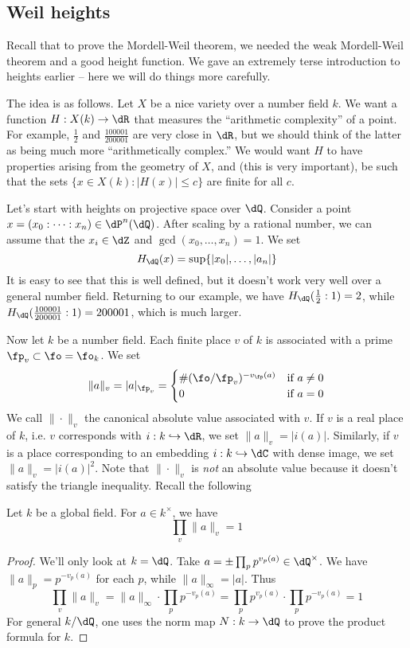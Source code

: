 \subsection{Weil heights}\label{sec:heights}

Recall that to prove the Mordell-Weil theorem, we needed the weak Mordell-Weil 
theorem and a good height function. We gave an extremely terse introduction to 
heights earlier -- here we will do things more carefully. 

The idea is as follows. Let $X$ be a nice variety over a number field $k$. We 
want a function $H:X(k)\to \dR$ that measures the ``arithmetic complexity'' of 
a point. For example, $\frac 1 2$ and $\frac{100001}{200001}$ are very close in 
$\dR$, but we should think of the latter as being much more ``arithmetically 
complex.'' We would want $H$ to have properties arising from the geometry of 
$X$, and (this is very important), be such that the sets 
$\{x\in X(k):|H(x)|\leqslant c\}$ are finite for all $c$. 

Let's start with heights on projective space over $\dQ$. Consider a point 
$x=(x_0:\cdots:x_n)\in \dP^n(\dQ)$. After scaling by a rational number, we can 
assume that the $x_i\in \dZ$ and $\gcd(x_0,\dots,x_n)=1$. We set 
\[
  H_\dQ(x) = \sup\{|x_0|,\dots,|a_n|\}
\]
It is easy to see that this is well defined, but it doesn't work very well over 
a general number field. Returning to our example, we have 
$H_\dQ(\frac 1 2:1)=2$, while $H_\dQ(\frac{100001}{200001}:1)=200001$, which is 
much larger. 

Now let $k$ be a number field. Each finite place $v$ of $k$ is associated with 
a prime $\fp_v\subset \fo=\fo_k$. We set 
\[
  \|a\|_v = |a|_{\fp_v} 
        = \begin{cases}
            \#(\fo/\fp_v)^{-v_\fp(a)} & \text{if $a\ne 0$} \\
            0                         & \text{if $a=0$}
          \end{cases}
\]
We call $\|\cdot\|_v$ the canonical absolute value associated with $v$. If $v$ 
is a real place of $k$, i.e. $v$ corresponds with $i:k\hookrightarrow \dR$, we 
set $\|a\|_v = |i(a)|$. Similarly, if $v$ is a place corresponding to an 
embedding $i:k\hookrightarrow \dC$ with dense image, we set 
$\|a\|_v=|i(a)|^2$. Note that $\|\cdot\|_v$ is \emph{not} an absolute value 
because it doesn't satisfy the triangle inequality. Recall the following 

\begin{theorem}
Let $k$ be a global field. For $a\in k^\times$, we have 
\[
  \prod_v \|a\|_v = 1
\]
\end{theorem}
\begin{proof}
We'll only look at $k=\dQ$. Take $a=\pm \prod_p p^{v_p(a)}\in \dQ^\times$. We 
have $\|a\|_p=p^{-v_p(a)}$ for each $p$, while $\|a\|_\infty = |a|$. Thus
\[
  \prod_v \|a\|_v = \|a\|_\infty\cdot \prod_p p^{-v_p(a)}  = \prod_p p^{v_p(a)}\cdot \prod_p p^{-v_p(a)} = 1
\]
For general $k/\dQ$, one uses the norm map $N:k\to \dQ$ to prove the product 
formula for $k$.
\end{proof}

